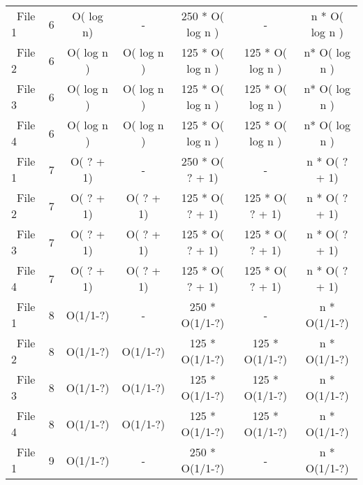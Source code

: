 \documentclass[8]{report}
\begin{document}
\begin{table}[ht]
\begin{adjustbox}{width=1.35\textwidth}
\begin{threeparttable}
\begin{tabular}{l*{6}{c}}
 
 

\ File 1 	&      6&     O( log n)  &    -  		&   250 * O( log n )    &  -   &  n * O( log n )   \\
                       

\ File 2 	&      6     &      O( log n )   &   O( log n ) 	&    125 * O( log n )   &   125 *  O( log n )     & n* O( log n  )  \\
                  
\ File 3 	&      6     &      O( log n )   &   O( log n ) 	&    125 * O( log n )   &   125 *  O( log n )     & n* O( log n  )  \\ 
 \ File 4 	&      6     &      O( log n )   &   O( log n ) 	&    125 * O( log n )   &   125 *  O( log n )     & n* O( log n  )  \\  
 
 
\ File 1 	&      7     &     O( ? + 1)   &   - &   250 * O( ? + 1)     &  -   &  n * O( ? + 1)   \\
                       

\ File 2 	&      7     &      O( ? + 1)    &  O( ? + 1)  	&    125 * O( ? + 1)    &    125 * O( ? + 1)     & n * O( ? + 1)   \\
                  
\ File 3 	&      7     &      O( ? + 1)    &  O( ? + 1)  	&    125 * O( ? + 1)    &    125 * O( ? + 1)     & n * O( ? + 1)   \\
 \ File 4 	&      7     &      O( ? + 1)    &  O( ? + 1)  	&    125 * O( ? + 1)    &    125 * O( ? + 1)     & n * O( ? + 1)   \\
 

\ File 1 	&      8  &     O(1/1-?)   &   - &   250 * O(1/1-?)     &  -   &  n * O(1/1-?)   \\
                       

\ File 2 	&      8     &      O(1/1-?)    &  O(1/1-?)  	&    125 * O(1/1-?)    &    125 * O(1/1-?)     & n * O(1/1-?)   \\
                  
\ File 3 	&      8     &      O(1/1-?)    &  O(1/1-?) 	&    125 * O(1/1-?)   &    125 * O(1/1-?)     & n * O(1/1-?)   \\
 \ File 4 	&      8     &      O(1/1-?)   &  O(1/1-?) 	&    125 * O(1/1-?)   &    125 * O(1/1-?)     & n * O(1/1-?)  \\
 
 
 
\ File 1 	&      9  &     O(1/1-?)   &   - &   250 * O(1/1-?)     &  -   &  n * O(1/1-?)   \\
                       


\end{tabular}
\end{threeparttable}
\end{adjustbox}
\end{table}
\end{document}
